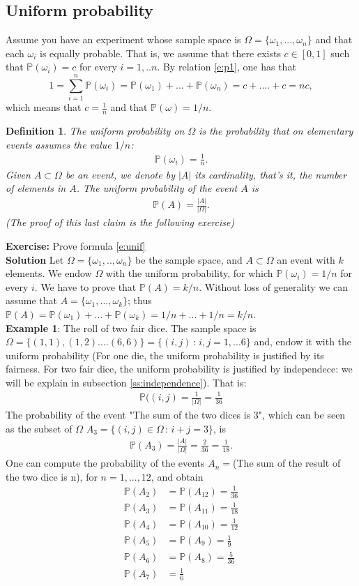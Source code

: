 \documentclass[reqno]{amsart}
\newtheorem{definition}[theorem]{Definition}
\newcommand{\<}{{\langle \!\! \langle}}
\renewcommand{\>}{{\rangle \!\! \rangle}}
\newcommand{\bel}[2]{\begin{equation} \label{#1} \begin{split} #2
 					\end{split} \end{equation}}
\begin{document}
\subsection{Uniform probability}
Assume you have an experiment whose sample space is $\Omega=\{\omega_1,...,\omega_n\}$ and that each $\omega_i$ is equally probable. That is, we assume that there exists $c\in [0,1]$ such that $\mathbb{P}(\omega_i)=c$ for every $i=1,..n$. By relation 
\eqref{e:p1}, one has that 
$$1=\sum_{i=1}^n\mathbb{P}(\omega_i)=\mathbb{P}(\omega_1)+...+\mathbb{P}(\omega_n)=c+....+c=nc,$$
which means that $c=\frac{1}{n}$ and that $\mathbb{P}(\omega)=1/n$. 
\begin{definition}
The uniform probability on $\Omega$ is the probability that on elementary events assumes the value $1/n$:
\bel{uni}{\mathbb{P}(\omega_i)=\frac{1}{n}.}
Given $A\subset \Omega $ be an event, we denote by $|A|$ its cardinality, that's it, the number of elements in $A$. The uniform probability of the event $A$ is 
\bel{e:unif}{\mathbb{P}(A)=\frac{|A|}{|\Omega|}.} (The proof of this last claim is the following exercise)
\end{definition}
 \textbf{Exercise:} Prove formula \eqref{e:unif}\\
 \textbf{Solution}
 Let $\Omega=\{\omega_1,..,\omega_n\}$ be the sample space, and $A\subset \Omega$ an event with $k$ elements. We endow $\Omega$ with the uniform probability, for which $\mathbb{P}(\omega_i)=1/n$ for every $i$. We have to prove that $\mathbb{P}(A)=k/n$. Without loss of generality we can assume that $A=\{\omega_1,...,\omega_k\}$; thus $\mathbb{P}(A)=\mathbb{P}(\omega_1)+...+\mathbb{P}(\omega_k)=1/n+...+1/n=k/n$.\\ 
\textbf{Example 1}: The roll of two fair dice. The sample space is $\Omega=\{(1,1),(1,2)....(6,6)\}=\{(i,j)\,:\, i,j=1,...6\}$ and, endow it with the uniform probability (For one die, the uniform probability is justified by its fairness. For two fair dice, the uniform probability is justified by independece: we will be explain in subsection \ref{ss:independence}). That is:
\bel{dice}{\mathbb{P}((i,j)=\frac{1}{|\Omega|}=\frac{1}{36}}
The probability of the event "The sum of the two dices is 3", which can be seen as the subset of $\Omega$ $A_3=\{(i,j)\in\Omega\,:\,i+j=3\}$, is 
\bel{a3}{\mathbb{P}(A_3)=\frac{|A|}{|\Omega|}=\frac{2}{36}=\frac{1}{18}.}
One can compute the probability of the events $A_n=$(The sum of the result of the two dice is n), for $n=1,...,12$, and obtain
\bel{sum}{
\mathbb{P}(A_2) &=\mathbb{P}(A_{12})=\frac{1}{36}\\
\mathbb{P}(A_3) &=\mathbb{P}(A_{11})= \frac{1}{18}\\
\mathbb{P}(A_4) &=\mathbb{P}(A_{10})= \frac{1}{12}\\
\mathbb{P}(A_5) &=\mathbb{P}(A_9)= \frac{1}{9}\\
\mathbb{P}(A_6) &=\mathbb{P}(A_8)= \frac{5}{36}\\
\mathbb{P}(A_7) &=\frac{1}{6}}
\end{document}
